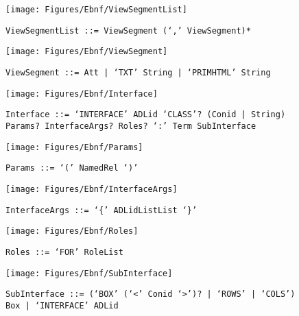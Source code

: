  \begin{figure}[H]
  \centering
  \texttt{[image: Figures/Ebnf/ViewSegmentList]}
  \caption*{\texttt{ViewSegmentList \small::=  ViewSegment (`,' ViewSegment)*}}
  \label{fig:ebnf-ViewSegmentList}
 \end{figure}

 \begin{figure}[H]
  \centering
  \texttt{[image: Figures/Ebnf/ViewSegment]}
  \caption*{\texttt{ViewSegment \small::=  Att | `TXT' String | `PRIMHTML' String}}
  \label{fig:ebnf-ViewSegment}
 \end{figure}

 \begin{figure}[H]
  \centering
  \texttt{[image: Figures/Ebnf/Interface]}
  \caption*{\texttt{Interface \small::=  `INTERFACE' ADLid `CLASS'? (Conid | String) Params? InterfaceArgs? Roles? `:' Term SubInterface}}
  \label{fig:ebnf-Interface}
 \end{figure}

 \begin{figure}[H]
  \centering
  \texttt{[image: Figures/Ebnf/Params]}
  \caption*{\texttt{Params \small::=  `(' NamedRel `)'}}
  \label{fig:ebnf-Params}
 \end{figure}

 \begin{figure}[H]
  \centering
  \texttt{[image: Figures/Ebnf/InterfaceArgs]}
  \caption*{\texttt{InterfaceArgs \small::=  `\{' ADLidListList `\}'}}
  \label{fig:ebnf-InterfaceArgs}
 \end{figure}

 \begin{figure}[H]
  \centering
  \texttt{[image: Figures/Ebnf/Roles]}
  \caption*{\texttt{Roles \small::=  `FOR' RoleList}}
  \label{fig:ebnf-Roles}
 \end{figure}

 \begin{figure}[H]
  \centering
  \texttt{[image: Figures/Ebnf/SubInterface]}
  \caption*{\texttt{SubInterface \small::=  (`BOX' (`<' Conid `>')? | `ROWS' | `COLS') Box | `INTERFACE' ADLid}}
  \label{fig:ebnf-SubInterface}
 \end{figure}

